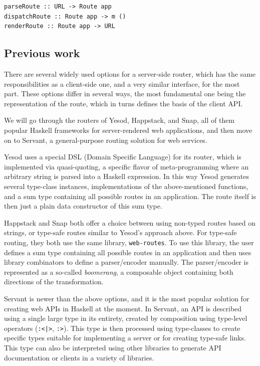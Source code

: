 \documentclass[english,odsaz]{fitthesis}
\begin{document}
\begin{verbatim}
parseRoute :: URL -> Route app
dispatchRoute :: Route app -> m ()
renderRoute :: Route app -> URL
\end{verbatim}

\subsection{Previous work}
\label{sec:org25b0dbf}
There are several widely used options for a server-side router, which has the
same responsibilities as a client-side one, and a very similar interface, for
the most part. These options differ in several ways, the most fundamental one
being the representation of the route, which in turns defines the basis of the
client API.

We will go through the routers of Yesod, Happstack, and Snap, all of them
popular Haskell frameworks for server-rendered web applications, and then move
on to Servant, a general-purpose routing solution for web services.

Yesod uses a special DSL (Domain Specific Language) for its router, which is
implemented via quasi-quoting, a specific flavor of meta-programming where an
arbitrary string is parsed into a Haskell expression. In this way Yesod
generates several type-class instances, implementations of the above-mentioned
functions, and a sum type containing all possible routes in an application. The
route itself is then just a plain data constructor of this sum type.

Happstack and Snap both offer a choice between using non-typed routes based on
strings, or type-safe routes similar to Yesod's approach above. For type-safe
routing, they both use the same library, \texttt{web-routes}. To use this library, the
user defines a sum type containing all possible routes in an application and
then uses library combinators to define a parser/encoder manually. The
parser/encoder is represented as a so-called \emph{boomerang}, a composable object
containing both directions of the transformation.

Servant is newer than the above options, and it is the most popular solution for
creating web APIs in Haskell at the moment. In Servant, an API is described
using a single large type in its entirety, created by composition using
type-level operators (\texttt{:<|>}, \texttt{:>}). This type is then processed using type-classes
to create specific types suitable for implementing a server or for creating
type-safe links. This type can also be interpreted using other libraries to
generate API documentation or clients in a variety of libraries.
\end{document}
